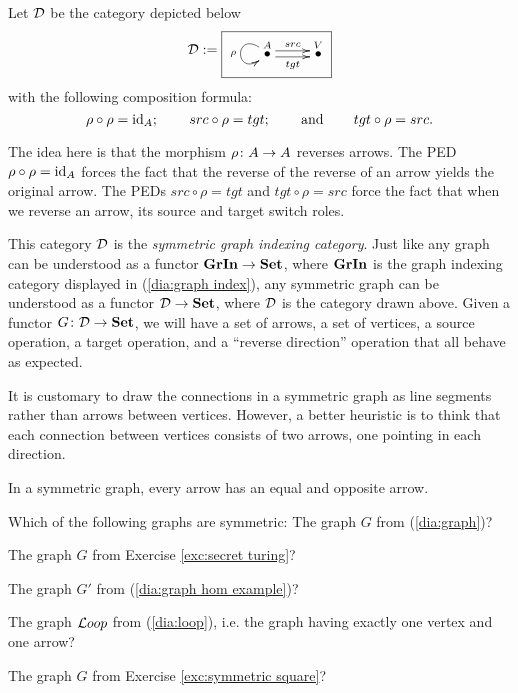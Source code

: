 \documentclass[CT4S-EN-RU]{subfiles}
\begin{document}
\begin{blockRUS}
\end{blockRUS}

\begin{exampleENG}
Let $\mathcal{D}$ be the category depicted below
\begin{align}\label{dia:symmetric graph index}
\mcD:=\fbox{\xymatrix{\LMO{A}\ar@(lu,ld)[]_\rho\ar@<.5ex>[r]^{src}\ar@<-.5ex>[r]_{tgt}&\LMO{V}}}
\end{align}
with the following composition formula: 
$$\rho\circ\rho=\textnormal{id}_A;\hspace{.3in} src\circ\rho=tgt;\hspace{.3in}\textnormal{and}\hspace{.3in} tgt\circ\rho=src.$$

The idea here is that the morphism $\rho\colon A\rightarrow A$ reverses arrows. The PED $\rho\circ\rho=\textnormal{id}_A$ forces the fact that the reverse of the reverse of an arrow yields the original arrow. The PEDs $src\circ\rho=tgt$ and $tgt\circ\rho=src$ force the fact that when we reverse an arrow, its source and target switch roles. 

This category $\mathcal{D}$ is the {\em symmetric graph indexing category}. Just like any graph can be understood as a functor ${\bf GrIn}\rightarrow{\bf Set}$, where ${\bf GrIn}$ is the graph indexing category displayed in (\ref{dia:graph index}), any symmetric graph can be understood as a functor $\mathcal{D}\rightarrow{\bf Set}$, where $\mathcal{D}$ is the category drawn above. Given a functor $G\colon\mathcal{D}\rightarrow{\bf Set}$, we will have a set of arrows, a set of vertices, a source operation, a target operation, and a “reverse direction” operation that all behave as expected.

It is customary to draw the connections in a symmetric graph as line segments rather than arrows between vertices. However, a better heuristic is to think that each connection between vertices consists of two arrows, one pointing in each direction. 
\end{exampleENG}

\begin{exampleRUS}
\end{exampleRUS}

\begin{sloganENG}
In a symmetric graph, every arrow has an equal and opposite arrow.
\end{sloganENG}

\begin{sloganRUS}
\end{sloganRUS}

\begin{exerciseENG}
Which of the following graphs are symmetric:
\sexc The graph $G$ from (\ref{dia:graph})?
\item The graph $G$ from Exercise \ref{exc:secret turing}?
\item The graph $G'$ from (\ref{dia:graph hom example})?
\item The graph ${\mathcal{L} oop}$ from (\ref{dia:loop}), i.e. the graph having exactly one vertex and one arrow?
\item The graph $G$ from Exercise \ref{exc:symmetric square}?
\endsexc
\end{exerciseENG}
\end{document}
